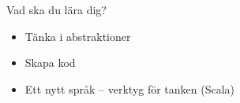 \documentclass{lecturesimple}
\begin{document}

\begin{Slide}{Vad ska du lära dig?}
  \begin{itemize}
    \item Tänka i abstraktioner
    \item Skapa kod
    \item Ett nytt språk -- verktyg för tanken (Scala)
  \end{itemize}
\end{Slide}

\end{document}
